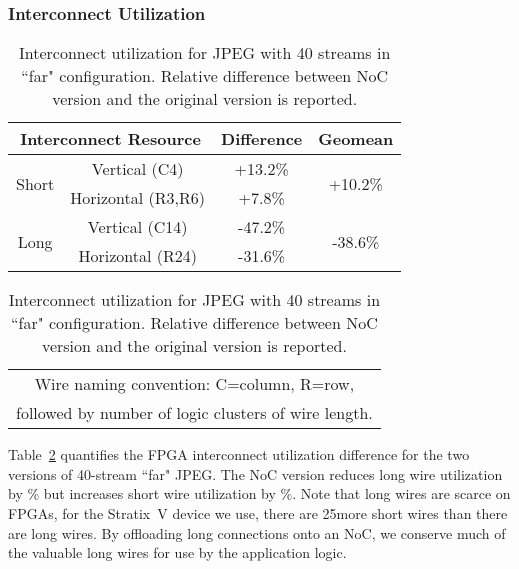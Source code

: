 \subsubsection{Interconnect Utilization}

%
\begin{table}[!t]
\centering
\begin{small}
    \caption{Interconnect utilization for JPEG with 40 streams in ``far" configuration. Relative difference between NoC version and the original version is reported.}
    \label{wire_util}
    \begin{tabular}{cccc}
    \toprule
    \multicolumn{2}{c}{Interconnect Resource}       & Difference & Geomean \\
    \midrule
	\multirow{2}{*}{Short}   & Vertical (C4)         & +13.2\%   & \multirow{2}{*}{+10.2\%} \\
	                         & Horizontal (R3,R6)   & +7.8\% & \\
	\midrule
	\multirow{2}{*}{Long} & Vertical (C14)           & -47.2\% & \multirow{2}{*}{-38.6\%}\\
	& Horizontal (R24)                              & -31.6\%  & \\
    \bottomrule
	\end{tabular}
    \begin{tabular}{cccc}
	\multicolumn{4}{c}{Wire naming convention: C=column, R=row, }\\
	\multicolumn{4}{c}{followed by number of logic clusters of wire length.}\\
    \end{tabular}
\end{small}
\end{table}
%

Table~\ref{wire_util} quantifies the FPGA interconnect utilization difference for the two versions of 40-stream ``far" JPEG.
The NoC version reduces long wire utilization by \% but increases short wire utilization by \%.
Note that long wires are scarce on FPGAs, for the Stratix~V device we use, there are 25\xx more short wires than there are long wires.
By offloading long connections onto an NoC, we conserve much of the valuable long wires for use by the application logic.

%
%

